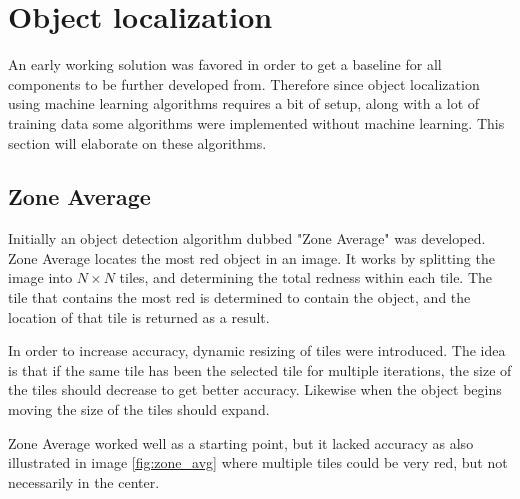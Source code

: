 \section{Object localization}\label{Design:ObjectLocalization}
An early working solution was favored in order to get a baseline for all components to be further developed from.
Therefore since object localization using machine learning algorithms requires a bit of setup, along with a lot of training data some algorithms were implemented without machine learning.
This section will elaborate on these algorithms.

\subsection{Zone Average}
Initially an object detection algorithm dubbed "Zone Average" was developed.
Zone Average locates the most red object in an image.
It works by splitting the image into $N\times N$ tiles, and determining the total redness within each tile.
The tile that contains the most red is determined to contain the object, and the location of that tile is returned as a result.

In order to increase accuracy, dynamic resizing of tiles were introduced.
The idea is that if the same tile has been the selected tile for multiple iterations, the size of the tiles should decrease to get better accuracy.
Likewise when the object begins moving the size of the tiles should expand.


Zone Average worked well as a starting point, but it lacked accuracy as also illustrated in image \ref{fig:zone_avg} where multiple tiles could be very red, but not necessarily in the center.


